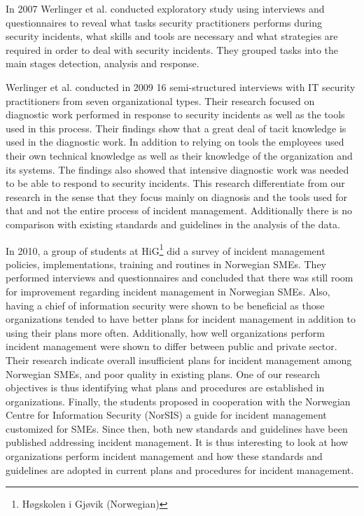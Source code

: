 In 2007 Werlinger et al. \cite{werlinger2007detecting} conducted exploratory study using interviews and questionnaires to reveal what tasks security practitioners performs during security incidents, what skills and tools are necessary and what strategies are required in order to deal with security incidents. They grouped tasks into the main stages detection, analysis and response.

Werlinger et al. \cite{werlinger2010preparation} conducted in 2009 16 semi-structured interviews with IT security practitioners from seven organizational types. Their research focused on diagnostic work performed in response to security incidents as well as the tools used in this process. Their findings show that a great deal of tacit knowledge is used in the diagnostic work. In addition to relying on tools the employees used their own technical knowledge as well as their knowledge of the organization and its systems. The findings also showed that intensive diagnostic work was needed to be able to respond to security incidents. This research differentiate from our research in the sense that they focus mainly on diagnosis and the tools used for that and not the entire process of incident management. Additionally there is no comparison with existing standards and guidelines in the analysis of the data.

In 2010, a group of students at HiG\footnote{H\o gskolen i Gj\o vik (Norwegian)} did a survey of incident management policies, implementations, training and routines in Norwegian \acp{SME}\cite{sand2010hendelseshaandtering}. They performed interviews and questionnaires and concluded that there was still room for improvement regarding incident management in Norwegian \acp{SME}. Also, having a chief of information security were shown to be beneficial as those organizations tended to have better plans for incident management in addition to using their plans more often. Additionally, how well organizations perform incident management were shown to differ between public and private sector. Their research indicate overall insufficient plans for incident management among Norwegian \acp{SME}, and poor quality in existing plans. One of our research objectives is thus identifying what plans and procedures are established in organizations. Finally, the students proposed in cooperation with the Norwegian Centre for Information Security (NorSIS) a guide for incident management customized for \acp{SME}. Since then, both new standards and guidelines have been published addressing incident management. It is thus interesting to look at how organizations perform incident management and how these standards and guidelines are adopted in current plans and procedures for incident management.

